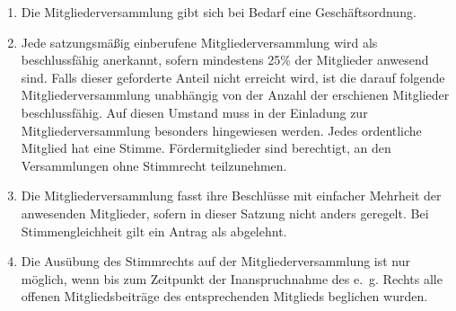 \documentclass[a4paper,12pt]{scrartcl}
\begin{document}
\begin{enumerate}
\begin{itemize}
    \end{itemize}
  \item Die Mitgliederversammlung gibt sich bei Bedarf eine Geschäftsordnung.
  \item Jede satzungsmäßig einberufene Mitgliederversammlung wird als
    beschlussfähig anerkannt, sofern mindestens 25\% der Mitglieder anwesend
    sind. Falls dieser geforderte Anteil nicht erreicht wird, ist die darauf
    folgende Mitgliederversammlung unabhängig von der Anzahl der erschienen
    Mitglieder beschlussfähig. Auf diesen Umstand muss in der Einladung zur
    Mitgliederversammlung besonders hingewiesen werden. Jedes ordentliche
    Mitglied hat eine Stimme. Fördermitglieder sind berechtigt, an den
    Versammlungen ohne Stimmrecht teilzunehmen.
  \item Die Mitgliederversammlung fasst ihre Beschlüsse mit einfacher Mehrheit
    der anwesenden Mitglieder, sofern in dieser Satzung nicht anders geregelt.
    Bei Stimmengleichheit gilt ein Antrag als abgelehnt.
  \item Die Ausübung des Stimmrechts auf der Mitgliederversammlung ist nur 
    möglich, wenn bis zum Zeitpunkt der Inanspruchnahme des e.~g. Rechts
    alle offenen Mitgliedsbeiträge des entsprechenden Mitglieds beglichen
    wurden.
\end{enumerate}
\end{document}
